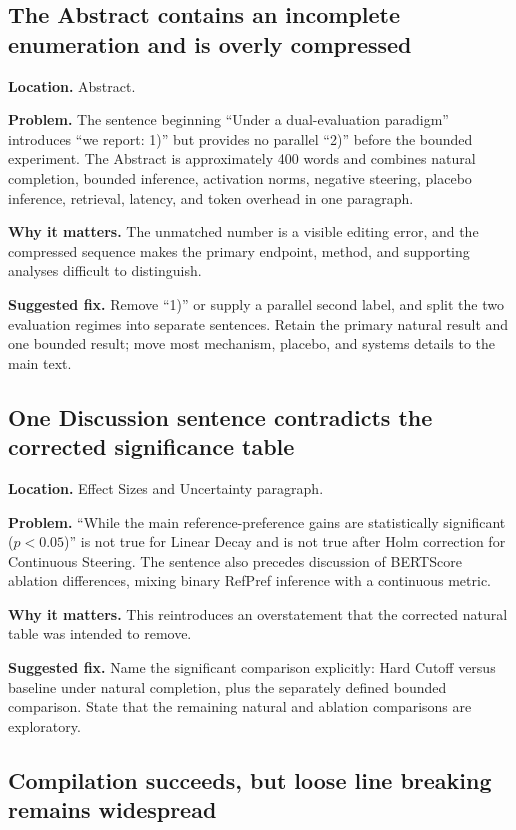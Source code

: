 \documentclass[11pt]{article}
\newcommand{\findinglabel}[1]{\textbf{#1}}
\begin{document}
\subsection*{The Abstract contains an incomplete enumeration and is overly compressed}

\findinglabel{Location.} Abstract.

\findinglabel{Problem.} The sentence beginning ``Under a dual-evaluation paradigm'' introduces ``we report: 1)'' but provides no parallel ``2)'' before the bounded experiment.  The Abstract is approximately 400 words and combines natural completion, bounded inference, activation norms, negative steering, placebo inference, retrieval, latency, and token overhead in one paragraph.

\findinglabel{Why it matters.} The unmatched number is a visible editing error, and the compressed sequence makes the primary endpoint, method, and supporting analyses difficult to distinguish.

\findinglabel{Suggested fix.} Remove ``1)'' or supply a parallel second label, and split the two evaluation regimes into separate sentences.  Retain the primary natural result and one bounded result; move most mechanism, placebo, and systems details to the main text.

\subsection*{One Discussion sentence contradicts the corrected significance table}

\findinglabel{Location.} Effect Sizes and Uncertainty paragraph.

\findinglabel{Problem.} ``While the main reference-preference gains are statistically significant ($p<0.05$)'' is not true for Linear Decay and is not true after Holm correction for Continuous Steering.  The sentence also precedes discussion of BERTScore ablation differences, mixing binary RefPref inference with a continuous metric.

\findinglabel{Why it matters.} This reintroduces an overstatement that the corrected natural table was intended to remove.

\findinglabel{Suggested fix.} Name the significant comparison explicitly: Hard Cutoff versus baseline under natural completion, plus the separately defined bounded comparison.  State that the remaining natural and ablation comparisons are exploratory.

\subsection*{Compilation succeeds, but loose line breaking remains widespread}
\end{document}
